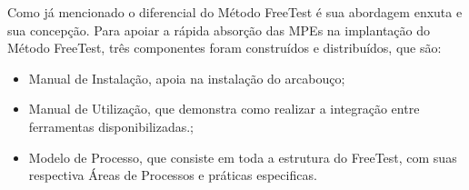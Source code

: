 \begin{table}[H]
\centering
\caption{Estrutura do Método FreeTest \cite{Camilo-junior2012}.}
\label{tab:3.4}
\end{table}

Como já mencionado o diferencial do Método FreeTest é sua abordagem enxuta e sua concepção. Para apoiar a rápida absorção das MPEs na implantação do Método FreeTest, três componentes foram construídos e distribuídos, que são:

\begin{itemize}
    \item Manual de Instalação, apoia na instalação do arcabouço;
    \item Manual de Utilização, que demonstra como realizar a integração entre ferramentas disponibilizadas.;
    \item Modelo de Processo, que consiste em toda a estrutura do FreeTest, com suas respectiva Áreas de Processos e práticas especificas.
\end{itemize}

